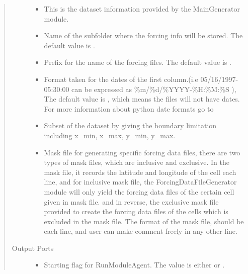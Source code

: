 \documentclass[letterpaper,10pt,english]{sphinxmanual}
\begin{document}
\begin{fulllineitems}
\begin{quote}
\begin{description}
\begin{itemize}
\item {} 
 This is the dataset information provided by the MainGenerator module.

\item {} 
 \sphinxstylestrong{{[}Optional{]}} Name of the subfolder where the forcing info will be stored. The default value is .

\item {} 
 \sphinxstylestrong{{[}Optional{]}} Prefix for the name of the forcing files. The default value is .

\item {} 
 \sphinxstylestrong{{[}Optional{]}} Format taken for the dates of the first column.(i.e 05/16/1997-05:30:00 can be expressed as \%m/\%d/\%YYYY-\%H:\%M:\%S ),         The default value is , which means the files will not have dates. For more information about python date formats go to 

\item {} 
 \sphinxstylestrong{{[}Optional{]}} Subset of the dataset by giving the boundary limitation including x\_min, x\_max, y\_min, y\_max.

\item {} 
 \sphinxstylestrong{{[}Optional{]}} Mask file for generating specific forcing data files, there are two types of mask files, which are inclusive and exclusive.        In the mask file, it records the latitude and longitude of the cell each line, and for inclusive mask file, the ForcingDataFileGenerator module will only        yield the forcing data files of the certain cell given in mask file. and in reverse, the exclusive mask file provided to create the forcing data files of the cells which is excluded in the mask file.        The format of the mask file, should be  each line, and user can make comment freely in any other line.

\end{itemize}

\item[{Output Ports}] \leavevmode\begin{itemize}
\item {} 
 Starting flag for RunModuleAgent. The value is either  or .


\end{itemize}
\end{description}
\end{quote}
\end{fulllineitems}
\end{document}
